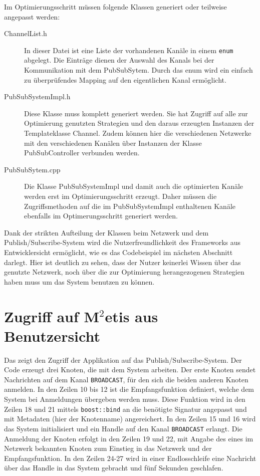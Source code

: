 Im Optimierungsschritt müssen folgende Klassen generiert oder teilweise angepasst werden:
\begin{description}
\item[ChannelList.h] In dieser Datei ist eine Liste der vorhandenen Kanäle in einem \texttt{enum} abgelegt. Die Einträge dienen der Auswahl des Kanals bei der Kommunikation mit dem PubSubSytem. Durch das enum wird ein einfach zu überprüfendes Mapping auf den eigentlichen Kanal ermöglicht.
\item[PubSubSystemImpl.h] Diese Klasse muss komplett generiert werden. Sie hat Zugriff auf alle zur Optimierung genutzten Strategien und den daraus erzeugten Instanzen der Templateklasse Channel. Zudem können hier die verschiedenen Netzwerke mit den verschiedenen Kanälen über Instanzen der Klasse PubSubController verbunden werden.
\item[PubSubSytem.cpp] Die Klasse PubSubSystemImpl und damit auch die optimierten Kanäle werden erst im Optimierungsschritt erzeugt. Daher müssen die Zugriffsmethoden auf die im PubSubSystemImpl enthaltenen Kanäle ebenfalls im Optimerungsschritt generiert werden.
\end{description}

Dank der strikten Aufteilung der Klassen beim Netzwerk und dem Publish/Subscribe-System wird die Nutzerfreundlichkeit des Frameworks aus Entwicklersicht ermöglicht, wie es das Codebeispiel im nächsten Abschnitt darlegt. Hier ist deutlich zu sehen, dass der Nutzer keinerlei Wissen über das genutzte Netzwerk, noch über die zur Optimierung herangezogenen Strategien haben muss um das System benutzen zu können.

\section*{Zugriff auf M$^2$etis aus Benutzersicht}
Das  zeigt den Zugriff der Applikation auf das Publish/Subscribe-System. Der Code erzeugt drei Knoten, die mit dem System arbeiten. Der erste Knoten sendet Nachrichten auf dem Kanal \texttt{BROADCAST}, für den sich die beiden anderen Knoten anmelden. In den Zeilen 10 bis 12 ist die Empfangsfunktion definiert, welche dem System bei Anmeldungen übergeben werden muss. Diese Funktion wird in den Zeilen 18 und 21 mittels \texttt{boost::bind} an die benötigte Signatur angepasst und mit Metadaten (hier der Knotenname) angereichert. In den Zeilen 15 und 16 wird das System initialisiert und ein Handle auf den Kanal \texttt{BROADCAST} erlangt. Die Anmeldung der Knoten erfolgt in den Zeilen 19 und 22, mit Angabe des eines im Netzwerk bekannten Knoten zum Einstieg in das Netzwerk und der Empfangsfunktion. In den Zeilen 24-27 wird in einer Endlosschleife eine Nachricht über das Handle in das System gebracht und fünf Sekunden geschlafen.

